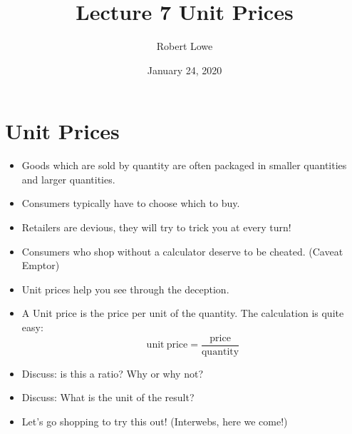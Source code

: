 \documentclass{article}
\title{Lecture 7 Unit Prices}
\author{Robert Lowe}
\date{January 24, 2020}
\begin{document}
\maketitle

\section*{Unit Prices}
\begin{itemize}
\item Goods which are sold by quantity are often packaged in smaller quantities and larger quantities.
\item Consumers typically have to choose which to buy.
\item Retailers are devious, they will try to trick you at every turn!
\item Consumers who shop without a calculator deserve to be cheated. (Caveat Emptor)
\item Unit prices help you see through the deception.
\item A Unit price is the price per unit of the quantity.  The calculation is quite easy:\newline
\[
    \mathrm{unit\ price} = \dfrac{\mathrm{price}}{\mathrm{quantity}}
\]
\item Discuss: is this a ratio? Why or why not?
\item Discuss: What is the unit of the result?
\item Let's go shopping to try this out!  (Interwebs, here we come!)
\end{itemize}
\end{document}
